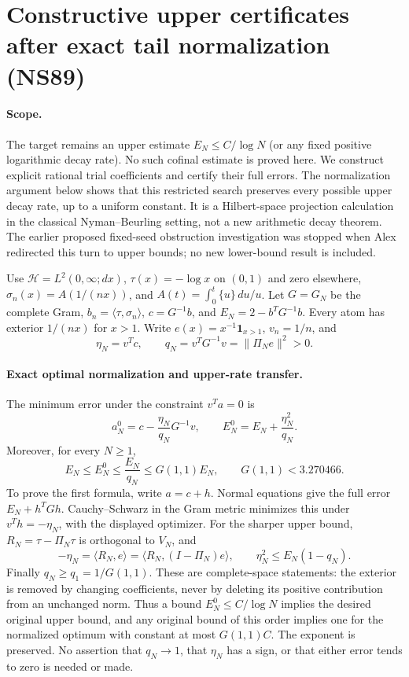 \section{Constructive upper certificates after exact tail normalization (NS89)}

\paragraph{Scope.}
The target remains an upper estimate $E_N\le C/\log N$ (or any fixed
positive logarithmic decay rate). No such cofinal estimate is proved here.
We construct explicit rational trial coefficients and certify their full
errors. The normalization argument below shows that this restricted search
preserves every possible upper decay rate, up to a uniform constant. It is
a Hilbert-space projection calculation in the classical Nyman--Beurling
setting, not a new arithmetic decay theorem. The earlier proposed
fixed-seed obstruction investigation was stopped when Alex redirected this
turn to upper bounds; no new lower-bound result is included.

Use $\mathcal H=L^2(0,\infty;dx)$, $\tau(x)=-\log x$ on $(0,1)$ and zero
elsewhere, $\sigma_n(x)=A(1/(nx))$, and
$A(t)=\int_0^t\{u\}\,du/u$. Let $G=G_N$ be the complete Gram,
$b_n=\langle\tau,\sigma_n\rangle$, $c=G^{-1}b$, and
$E_N=2-b^TG^{-1}b$. Every atom has exterior $1/(nx)$ for $x>1$.
Write $e(x)=x^{-1}\mathbf1_{x>1}$, $v_n=1/n$, and
\[
 \eta_N=v^Tc,\qquad q_N=v^TG^{-1}v=\|\Pi_N e\|^2>0.
\]

\paragraph{Exact optimal normalization and upper-rate transfer.}
The minimum error under the constraint $v^Ta=0$ is
\begin{equation}
 a_N^0=c-\frac{\eta_N}{q_N}G^{-1}v,\qquad
 E_N^0=E_N+\frac{\eta_N^2}{q_N}.
 \label{eq:ns89-optimal-normalization}
\end{equation}
Moreover, for every $N\ge1$,
\begin{equation}
 E_N\le E_N^0\le\frac{E_N}{q_N}\le G(1,1)E_N,
 \qquad G(1,1)<3.270466.
 \label{eq:ns89-upper-transfer}
\end{equation}
To prove the first formula, write $a=c+h$. Normal equations give the
full error $E_N+h^TGh$. Cauchy--Schwarz in the Gram metric minimizes this
under $v^Th=-\eta_N$, with the displayed optimizer. For the sharper upper
bound, $R_N=\tau-\Pi_N\tau$ is orthogonal to $V_N$, and
\[
 -\eta_N=\langle R_N,e\rangle
 =\langle R_N,(I-\Pi_N)e\rangle,
 \qquad \eta_N^2\le E_N(1-q_N).
\]
Finally $q_N\ge q_1=1/G(1,1)$. These are complete-space statements:
the exterior is removed by changing coefficients, never by deleting its
positive contribution from an unchanged norm. Thus a bound
$E_N^0\le C/\log N$ implies the desired original upper bound, and any
original bound of this order implies one for the normalized optimum with
constant at most $G(1,1)C$. The exponent is preserved. No assertion that
$q_N\to1$, that $\eta_N$ has a sign, or that either error tends to zero is
needed or made.

